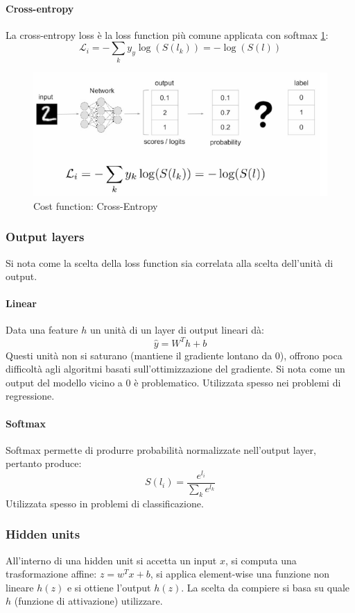 			\paragraph{Cross-entropy}
			La cross-entropy loss \`e la loss function pi\`u comune applicata con softmax \ref{fig:chapter11-06}:
			$$\mathcal{L}_i = -\sum\limits_ky_y\log(S(l_k)) = -\log(S(l))$$
			
			\begin{figure}
				\centering
				\includegraphics[width=0.6\linewidth]{imgs/chapter11/img6}
				\caption{Cost function: Cross-Entropy}
				\label{fig:chapter11-06}
			\end{figure}
		
		\subsubsection{Output layers}
		Si nota come la scelta della loss function sia correlata alla scelta dell'unit\`a di output.

			\paragraph{Linear}
			Data una feature $h$ un unit\`a di un layer di output lineari d\`a:
			$$\hat{y} = W^Th+b$$
			Questi unit\`a non si saturano (mantiene il gradiente lontano da $0$), offrono poca difficolt\`a agli algoritmi basati sull'ottimizzazione del gradiente.
			Si nota come un output del modello vicino a $0$ \`e problematico.
			Utilizzata spesso nei problemi di regressione.

			\paragraph{Softmax}
			Softmax permette di produrre probabilit\`a normalizzate nell'output layer, pertanto produce:
			$$S(l_i) = \frac{e^{l_i}}{\sum\limits_ke^{l_k}}$$
			Utilizzata spesso in problemi di classificazione.
		\subsubsection{Hidden units}
		All'interno di una hidden unit si accetta un input $x$, si computa una trasformazione affine: $z = w^Tx+b$, si applica element-wise una funzione non lineare $h(z)$ e si ottiene l'output $h(z)$.
		La scelta da compiere si basa su quale $h$ (funzione di attivazione) utilizzare.

